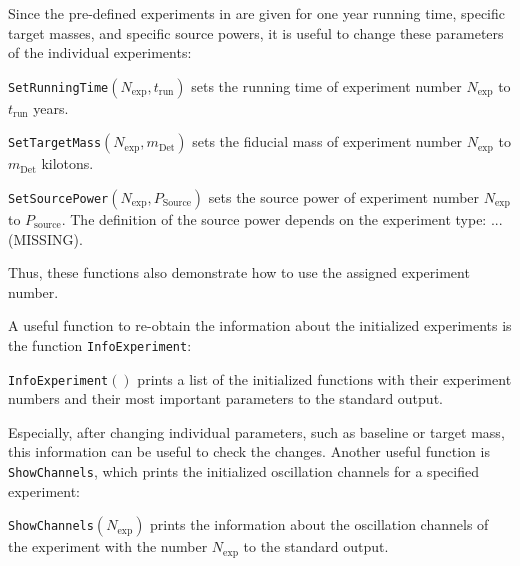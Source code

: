 Since the pre-defined experiments in  are given for one year running time, specific target masses, and specific source powers, it is useful to change these parameters of the individual experiments:
\begin{function}
{\tt SetRunningTime}$(N_{\mathrm{exp}},t_{\mathrm{run}})$ sets the running time of experiment number $N_{\mathrm{exp}}$ to $t_{\mathrm{run}}$ years.
\end{function}
 \begin{function}
{\tt SetTargetMass}$(N_{\mathrm{exp}},m_{\mathrm{Det}})$ sets the fiducial mass of experiment number $N_{\mathrm{exp}}$ to $m_{\mathrm{Det}}$ kilotons.
\end{function}
\begin{function}
{\tt SetSourcePower}$(N_{\mathrm{exp}},P_{\mathrm{Source}})$ sets the source power of experiment number $N_{\mathrm{exp}}$ to $P_{\mathrm{source}}$. The definition of the source power depends on the experiment type: ... (MISSING).
\end{function}
Thus, these functions also demonstrate how to use the assigned experiment number.

A useful function to re-obtain the information about the initialized experiments is the function {\tt InfoExperiment}:
\begin{function}
{\tt InfoExperiment}$()$ prints a list of the initialized functions with their experiment numbers and their most important parameters to the standard output.
\end{function} 
Especially, after changing individual parameters, such as baseline or target mass, this information can be useful to check the changes. Another useful function is {\tt ShowChannels}, which prints the initialized oscillation channels for a specified experiment:
\begin{function}
{\tt ShowChannels}$(N_{\mathrm{exp}})$ prints the information about the oscillation channels of the experiment with the number $N_{\mathrm{exp}}$ to the standard output.
\end{function}

